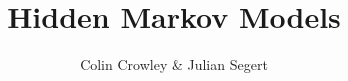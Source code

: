 \documentclass[11pt]{article}
\title{Hidden Markov Models}
\author{Colin Crowley \& Julian Segert}
\date{}
\begin{document}
\maketitle

\begin{abstract}
\end{abstract}


%

%
%
%
%





\appendix
%
%
\end{document}

